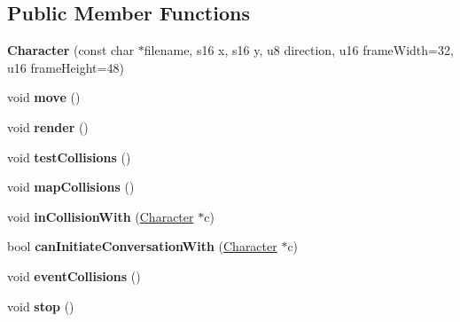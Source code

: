 \subsection*{Public Member Functions}
\begin{DoxyCompactItemize}
\item 
\hypertarget{classCharacter_a2f9e7d0c3b1145a9a921c447f9a3bab7}{{\bfseries Character} (const char $\ast$filename, s16 x, s16 y, u8 direction, u16 frame\-Width=32, u16 frame\-Height=48)}\label{classCharacter_a2f9e7d0c3b1145a9a921c447f9a3bab7}

\item 
\hypertarget{classCharacter_a639f0dfe68079c01cb702073a6451659}{void {\bfseries move} ()}\label{classCharacter_a639f0dfe68079c01cb702073a6451659}

\item 
\hypertarget{classCharacter_aa2026e8ecdbb479eb7bf978575a3a745}{void {\bfseries render} ()}\label{classCharacter_aa2026e8ecdbb479eb7bf978575a3a745}

\item 
\hypertarget{classCharacter_a0f8b3a43420b0fda18d7898bdfca4c2a}{void {\bfseries test\-Collisions} ()}\label{classCharacter_a0f8b3a43420b0fda18d7898bdfca4c2a}

\item 
\hypertarget{classCharacter_a03a3141917ed01abbc72f4c057593bca}{void {\bfseries map\-Collisions} ()}\label{classCharacter_a03a3141917ed01abbc72f4c057593bca}

\item 
\hypertarget{classCharacter_a5462e0c77d02977422aae246ff083005}{void {\bfseries in\-Collision\-With} (\hyperlink{classCharacter}{Character} $\ast$c)}\label{classCharacter_a5462e0c77d02977422aae246ff083005}

\item 
\hypertarget{classCharacter_aed7792d0d0863523c95bd2a888cc8eac}{bool {\bfseries can\-Initiate\-Conversation\-With} (\hyperlink{classCharacter}{Character} $\ast$c)}\label{classCharacter_aed7792d0d0863523c95bd2a888cc8eac}

\item 
\hypertarget{classCharacter_ab8e600ac0238b28f40e67e897fb68ca8}{void {\bfseries event\-Collisions} ()}\label{classCharacter_ab8e600ac0238b28f40e67e897fb68ca8}

\item 
\hypertarget{classCharacter_ab9575098086840989f4bf4565e14513f}{void {\bfseries stop} ()}\label{classCharacter_ab9575098086840989f4bf4565e14513f}


\end{DoxyCompactItemize}
